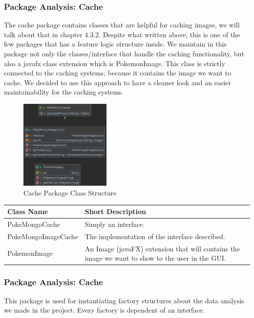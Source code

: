 \subsubsection{Package Analysis: Cache}
The cache package contains classes that are helpful for caching images, we will talk about that in chapter 4.3.2. Despite what written above, this is one of the few packages that has a feature logic structure inside. We maintain in this package not only the classes/interface that handle the caching functionality, but also a javafx class extension which is PokemonImage. This class is strictly connected to the caching systems, because it contains the image we want to cache. We decided to use this approach to have a cleaner look and an easier maintainability for the caching systems. 
\begin{figure}[H]
	\centering
	\includegraphics[width=0.4\textwidth]{img/cache_package.png}
	\caption{Cache Package Class Structure}
\end{figure}

\begin{center}
	\begin{tabular}{| m{14em} | m{19em} |} 
		\hline
		\textbf{Class Name} & \textbf{Short Description} \\ [0.5ex] 
		\hline
		PokeMongoCache & Simply an interface.\\ 
		\hline
		PokeMongoImageCache & The implementation of the interface described.\\ 
		\hline
		PokemonImage & An Image (javaFX) extension that will contains the image we want to show to the user in the GUI.\\ 
		\hline
	\end{tabular}
\end{center}

\subsubsection{Package Analysis: Cache}
This package is used for instantiating factory structures about the data analysis we made in the project. Every factory is dependent of an interface. 


